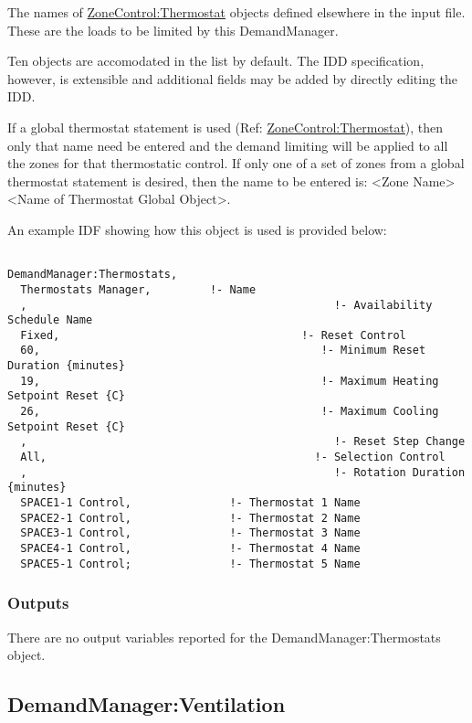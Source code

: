 The names of \hyperref[zonecontrolthermostat]{ZoneControl:Thermostat} objects defined elsewhere in the input file. These are the loads to be limited by this DemandManager.

Ten objects are accomodated in the list by default. The IDD specification, however, is extensible and additional fields may be added by directly editing the IDD.

If a global thermostat statement is used (Ref: \hyperref[zonecontrolthermostat]{ZoneControl:Thermostat}), then only that name need be entered and the demand limiting will be applied to all the zones for that thermostatic control. If only one of a set of zones from a global thermostat statement is desired, then the name to be entered is: \textless{}Zone Name\textgreater{} \textless{}Name of Thermostat Global Object\textgreater{}.

An example IDF showing how this object is used is provided below:

\begin{lstlisting}

DemandManager:Thermostats,
  Thermostats Manager,         !- Name
  ,                                               !- Availability Schedule Name
  Fixed,                                     !- Reset Control
  60,                                           !- Minimum Reset Duration {minutes}
  19,                                           !- Maximum Heating Setpoint Reset {C}
  26,                                           !- Maximum Cooling Setpoint Reset {C}
  ,                                               !- Reset Step Change
  All,                                         !- Selection Control
  ,                                               !- Rotation Duration {minutes}
  SPACE1-1 Control,               !- Thermostat 1 Name
  SPACE2-1 Control,               !- Thermostat 2 Name
  SPACE3-1 Control,               !- Thermostat 3 Name
  SPACE4-1 Control,               !- Thermostat 4 Name
  SPACE5-1 Control;               !- Thermostat 5 Name
\end{lstlisting}

\subsubsection{Outputs}\label{outputs-4-002}

There are no output variables reported for the DemandManager:Thermostats object.

\subsection{DemandManager:Ventilation}\label{demandmanagerventilation}

